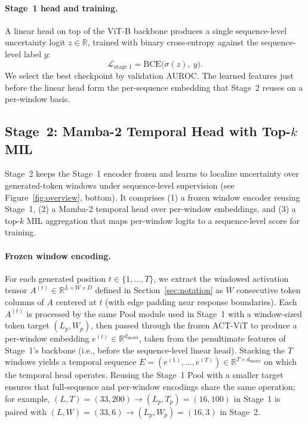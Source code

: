 \paragraph{Stage~1 head and training.} A linear head on top of the
ViT-B backbone produces a single sequence-level uncertainty logit
$z \in \mathbb{R}$, trained with binary cross-entropy against the
sequence-level label $y$:
\begin{equation}
    \mathcal{L}_{\text{stage 1}} = \mathrm{BCE}\bigl(\sigma(z),\ y\bigr).
\end{equation}
We select the best checkpoint by validation AUROC. The learned features
just before the linear head form the per-sequence embedding that
Stage~2 reuses on a per-window basis.

\subsection{Stage~2: Mamba-2 Temporal Head with Top-$k$ MIL}
\label{sec:temporal_head}

Stage~2 keeps the Stage~1 encoder frozen and learns to localize
uncertainty over generated-token windows under sequence-level
supervision (see Figure~\ref{fig:overview}, bottom). It comprises
(1) a frozen window encoder reusing Stage~1, (2) a Mamba-2 temporal
head over per-window embeddings, and (3) a top-$k$ MIL aggregation that
maps per-window logits to a sequence-level score for training.

\paragraph{Frozen window encoding.} For each generated position
$t \in \{1, \dots, T\}$, we extract the windowed activation tensor
$A^{(t)} \in \mathbb{R}^{L \times W \times D}$ defined in
Section~\ref{sec:notation} as $W$ consecutive token columns of $A$
centered at $t$ (with edge padding near response boundaries). Each
$A^{(t)}$ is processed by the same Pool module used in Stage~1 with a
window-sized token target $(L_p, W_p)$, then passed through the frozen
ACT-ViT to produce a per-window embedding
$e^{(t)} \in \mathbb{R}^{d_{\text{model}}}$, taken from the
penultimate features of Stage~1's backbone (i.e., before the
sequence-level linear head). Stacking the $T$ windows yields a temporal
sequence
$E = (e^{(1)}, \dots, e^{(T)}) \in \mathbb{R}^{T \times d_{\text{model}}}$
on which the temporal head operates. Reusing the Stage~1 Pool with a
smaller target ensures that full-sequence and per-window encodings
share the same operation; for example, $(L, T)=(33, 200) \to (L_p, T_p)=(16, 100)$
in Stage~1 is paired with $(L, W)=(33, 6) \to (L_p, W_p)=(16, 3)$ in
Stage~2.

